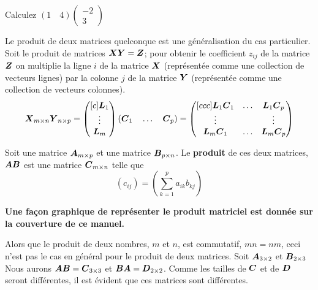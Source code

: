 \begin{exerciceB}
Calculez $\displaystyle (1 \quad 4)\begin{pmatrix}
-2 \\ 3
\end{pmatrix}$
\end{exerciceB}

Le produit de deux matrices quelconque est une généralisation du cas particulier.  
Soit le produit de matrices $\boldsymbol{X}\boldsymbol{Y} = \boldsymbol{Z}$; pour obtenir le coefficient $z_{ij}$ de la matrice $\boldsymbol{Z}$ on multiplie la ligne $i$ de la matrice $\boldsymbol{X}$ (représentée comme une collection de vecteurs lignes) par la colonne $j$ de la matrice $\boldsymbol{Y}$ (représentée comme une collection de vecteurs colonnes).
\begin{equation}
\boldsymbol{X}_{m\times n}\boldsymbol{Y}_{n \times p}  = \begin{pmatrix}[c]\boldsymbol{L}_1 \\ \vdots \\ \boldsymbol{L}_m \end{pmatrix} 
(\boldsymbol{C}_1\quad  \ldots \quad \boldsymbol{C}_p) =
\begin{pmatrix}[ccc]
\boldsymbol{L}_1\boldsymbol{C}_1 & \ldots & \boldsymbol{L}_1\boldsymbol{C}_p \\
\vdots && \vdots \\
\boldsymbol{L}_m \boldsymbol{C}_1 & \ldots & \boldsymbol{L}_m \boldsymbol{C}_p
\end{pmatrix}\label{eq:mult}
\end{equation}

\begin{defini}
Soit une matrice $\boldsymbol{A}_{m\times p}$ et une matrice $\boldsymbol{B}_{p\times n}$.  
Le \textbf{produit} de ces deux matrices, $\boldsymbol{A}\boldsymbol{B}$ est une matrice $\boldsymbol{C}_{m\times n}$ telle que
\[
(c_{ij}) = \left(\sum_{k=1}^{p} a_{ik} b_{kj}\right)
\]
\end{defini}

\textbf{Une façon graphique de représenter le produit matriciel est donnée sur la couverture de ce manuel.}

Alors que le produit de deux nombres, $m$ et $n$, est commutatif, $mn = nm$, ceci n'est pas le cas en général pour le produit
de deux matrices.
Soit $\boldsymbol{A}_{3\times2}$ et $\boldsymbol{B}_{2\times3}$  Nous aurons $\boldsymbol{A}\boldsymbol{B} = \boldsymbol{C}_{3\times3}$ et $\boldsymbol{B}\boldsymbol{A} = \boldsymbol{D}_{2\times2}$.  
Comme les tailles de $\boldsymbol{C}$ et de $\boldsymbol{D}$ seront différentes, il est évident que ces matrices sont différentes.


